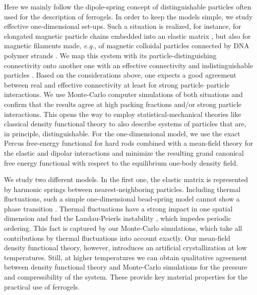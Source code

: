 \documentclass[aps,pre,twocolumn,superscriptaddress,nofootinbib]{revtex4}
\begin{document}
Here we mainly follow the dipole-spring concept of distinguishable particles often used for the description of ferrogels. 
In order to keep the models simple, we study effective one-dimensional set-ups. 
Such a situation is realized, for instance, for elongated magnetic particle chains embedded into an elastic matrix \cite{huang2016buckling}, but also for magnetic filaments \cite{sanchez2013effects} made, \textit{e.g.}, of magnetic colloidal particles connected by DNA polymer strands \cite{dreyfus2005microscopic}. 
We map this system with its particle-distinguishing connectivity onto another one with an effective connectivity and indistinguishable particles \cite{Denton2007_inbook}.
Based on the considerations above, one expects a good agreement between real and effective connectivity at least for strong particle--particle interactions.
We use Monte-Carlo computer simulations of both situations and confirm that the results agree at high packing fractions and/or strong particle interactions. 
This opens the way to employ statistical-mechanical theories like classical density functional theory to also describe systems of particles that are, in principle, distinguishable. 
For the one-dimensional model, we use the exact Percus free-energy functional for hard rods \cite{Percus1976_JStatPhys} combined with a mean-field theory for the elastic and dipolar interactions and minimize the resulting grand canonical free energy functional with respect to the equilibrium one-body density field. 

We study two different models. 
In the first one, the elastic matrix is represented by harmonic springs between nearest-neighboring particles. 
Including thermal fluctuations, such a simple one-dimensional bead-spring model cannot show a phase transition \cite{VanHove1952_Physica,Cuesta2004_JStatPhys}. 
Thermal fluctuations have a strong impact in one spatial dimension and fuel the Landau-Peierls instability \cite{Landau2008_UkrJPhys,Peierls1934_HelvPhysActa,Chaikin2000_book}, which impedes periodic ordering. 
This fact is captured by our Monte-Carlo simulations, which take all contributions by thermal fluctuations into account exactly.  
Our mean-field density functional theory, however, introduces an artificial crystallization at low temperatures. 
Still, at higher temperatures we can obtain qualitative agreement between density functional theory and Monte-Carlo simulations for the pressure and compressibility of the system. 
These provide key material properties for the practical use of ferrogels. 
\end{document}
